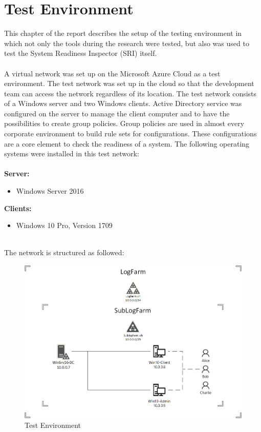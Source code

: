 \section{Test Environment}\label{sec:testenvironment}
This chapter of the report describes the setup of the testing environment in which not only the tools during the research were tested, but also was used to test the System Readiness Inspector (SRI) itself.
\\\\
A virtual network was set up on the Microsoft Azure Cloud as a test environment. The test network was set up in the cloud so that the development team can access the network regardless of its location. The test network consists of a Windows server and two Windows clients. Active Directory service was configured on the server to manage the client computer and to have the possibilities to create group policies. Group policies are used in almost every corporate environment to build rule sets for configurations. These configurations are a core element to check the readiness of a system. The following operating systems were installed in this test network: \\
\\
\textbf{Server:}
\begin{itemize}
    \item Windows Server 2016
\end{itemize}
\textbf{Clients:}
\begin{itemize}
    \item Windows 10 Pro, Version 1709
\end{itemize}
\ \\
The network is structured as followed:\\
\begin{figure}[H]
    \centering
    \includegraphics[width=0.9\linewidth]{assets/test-environment/testnetwork.png}
    \caption{Test Environment}
\end{figure}

